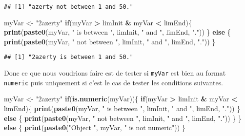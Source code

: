 \documentclass[]{book}
\newenvironment{Shaded}{\begin{snugshade}}{\end{snugshade}}
\newcommand{\KeywordTok}[1]{\textcolor[rgb]{0.13,0.29,0.53}{\textbf{#1}}}
\newcommand{\StringTok}[1]{\textcolor[rgb]{0.31,0.60,0.02}{#1}}
\newcommand{\ControlFlowTok}[1]{\textcolor[rgb]{0.13,0.29,0.53}{\textbf{#1}}}
\newcommand{\OperatorTok}[1]{\textcolor[rgb]{0.81,0.36,0.00}{\textbf{#1}}}
\newcommand{\NormalTok}[1]{#1}
\theoremstyle{definition}
\theoremstyle{definition}
\theoremstyle{definition}
\theoremstyle{remark}
\begin{document}
\begin{verbatim}
## [1] "azerty not between 1 and 50."
\end{verbatim}

\begin{Shaded}
\begin{Highlighting}[]
\NormalTok{myVar <-}\StringTok{ "2azerty"}
\ControlFlowTok{if}\NormalTok{(myVar }\OperatorTok{>}\StringTok{ }\NormalTok{limInit }\OperatorTok{&}\StringTok{ }\NormalTok{myVar }\OperatorTok{<}\StringTok{ }\NormalTok{limEnd)\{}
  \KeywordTok{print}\NormalTok{(}\KeywordTok{paste0}\NormalTok{(myVar, }\StringTok{" is between "}\NormalTok{, limInit, }\StringTok{" and "}\NormalTok{, limEnd, }\StringTok{"."}\NormalTok{))}
\NormalTok{\} }\ControlFlowTok{else}\NormalTok{ \{}
  \KeywordTok{print}\NormalTok{(}\KeywordTok{paste0}\NormalTok{(myVar, }\StringTok{" not between "}\NormalTok{, limInit, }\StringTok{" and "}\NormalTok{, limEnd, }\StringTok{"."}\NormalTok{))}
\NormalTok{\}}
\end{Highlighting}
\end{Shaded}

\begin{verbatim}
## [1] "2azerty is between 1 and 50."
\end{verbatim}

Donc ce que nous voudrions faire est de tester si \texttt{myVar} est
bien au format \texttt{numeric} puis uniquement si c'est le cas de
tester les conditions suivantes.

\begin{Shaded}
\begin{Highlighting}[]
\NormalTok{myVar <-}\StringTok{ "2azerty"}
\ControlFlowTok{if}\NormalTok{(}\KeywordTok{is.numeric}\NormalTok{(myVar))\{}
  \ControlFlowTok{if}\NormalTok{(myVar }\OperatorTok{>}\StringTok{ }\NormalTok{limInit }\OperatorTok{&}\StringTok{ }\NormalTok{myVar }\OperatorTok{<}\StringTok{ }\NormalTok{limEnd)\{}
    \KeywordTok{print}\NormalTok{(}\KeywordTok{paste0}\NormalTok{(myVar, }\StringTok{" is between "}\NormalTok{, limInit, }\StringTok{" and "}\NormalTok{, limEnd, }\StringTok{"."}\NormalTok{))}
\NormalTok{  \} }\ControlFlowTok{else}\NormalTok{ \{}
    \KeywordTok{print}\NormalTok{(}\KeywordTok{paste0}\NormalTok{(myVar, }\StringTok{" not between "}\NormalTok{, limInit, }\StringTok{" and "}\NormalTok{, limEnd, }\StringTok{"."}\NormalTok{))}
\NormalTok{  \}}
\NormalTok{\} }\ControlFlowTok{else}\NormalTok{ \{}
  \KeywordTok{print}\NormalTok{(}\KeywordTok{paste0}\NormalTok{(}\StringTok{"Object "}\NormalTok{, myVar, }\StringTok{" is not numeric"}\NormalTok{))}
\NormalTok{\}}
\end{Highlighting}
\end{Shaded}
\end{document}
